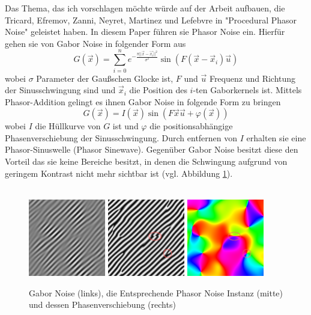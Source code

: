 \documentclass[a4paper]{scrartcl}
\begin{document}
Das Thema, das ich vorschlagen möchte würde auf der Arbeit aufbauen, die Tricard, Efremov, Zanni, Neyret, Martinez und Lefebvre in "Procedural Phasor Noise" geleistet haben. In diesem Paper führen sie Phasor Noise ein. Hierfür gehen sie von Gabor Noise in folgender Form aus
$$
G(\vec{x}) = \sum_{i=0}^ne^{-\frac{\pi||\vec{x}-\vec{x_i}||^2}{\sigma^2}}\sin(F(\vec{x}-\vec{x}_i)\vec{u})
$$
wobei $\sigma$ Parameter der Gaußschen Glocke ist, $F$ und $\vec{u}$ Frequenz und Richtung der Sinusschwingung sind und $\vec{x}_i$ die Position des $i$-ten Gaborkernels ist. Mittels Phasor-Addition gelingt es ihnen Gabor Noise in folgende Form zu bringen
$$
G(\vec{x}) = I(\vec{x})\sin(F\vec{x}\vec{u}+\varphi(\vec{x}))
$$
wobei $I$ die Hüllkurve von $G$ ist und $\varphi$ die positionsabhängige Phasenverschiebung der Sinusschwingung. Durch entfernen von $I$ erhalten sie eine Phasor-Sinuswelle (Phasor Sinewave). Gegenüber Gabor Noise besitzt diese den Vorteil das sie keine Bereiche besitzt, in denen die Schwingung aufgrund von geringem Kontrast nicht mehr sichtbar ist (vgl. Abbildung \ref{fig:fig}).\\
\\
\begin{figure}[h]
	\centering
	\includegraphics[width=0.3\textwidth]{gaborNoise}
	\includegraphics[width=0.3\textwidth]{phasorSineWave}
	\includegraphics[width=0.3\textwidth]{phasorPhase}
	\caption{Gabor Noise (links), die Entsprechende Phasor Noise Instanz (mitte) und dessen Phasenverschiebung (rechts)}
	\label{fig:fig}
\end{figure}
\end{document}
